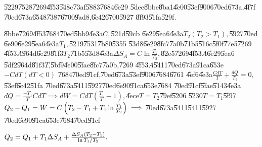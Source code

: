 \documentclass{article}
\begin{document}
\U{5229}\U{7528}\U{7269}\U{4f53}\U{548c}\U{73af}\U{5883}\U{7684}\U{6e29}%
\U{5dee}\U{8bbe}\U{8ba1}\U{4e00}\U{53ef}\U{9006}\U{70ed}\U{673a},\U{4f7f}%
\U{70ed}\U{673a}\U{6548}\U{7387}\U{6700}\U{9ad8},\U{6c42}\U{6700}\U{5927}%
\U{8f93}\U{51fa}\U{529f}.

\U{8bbe}\U{7269}\U{4f53}\U{7684}\U{70ed}\U{5bb9}\U{4e3a}$C,$\U{521d}\U{59cb}%
\U{6e29}\U{5ea6}\U{4e3a}$T_{2}\left( T_{2}>T_{1}\right) ,$\U{5927}\U{70ed}%
\U{6e90}\U{6e29}\U{5ea6}\U{4e3a}$T_{1},$\U{5219}\U{7531}\U{7b80}\U{5355}%
\U{53d8}\U{6e29}\U{8fc7}\U{7a0b}\U{71b5}\U{516c}\U{5f0f}\U{77e5}\U{7269}%
\U{4f53}$A$\U{964d}\U{6e29}\U{81f3}$T_{2}$\U{71b5}\U{53d8}\U{4e3a}$\Delta
S_{A}=C\ln \frac{T_{1}}{T_{2}},$\U{82e5}\U{7269}\U{4f53}$A$\U{6e29}\U{5ea6}%
\U{5df2}\U{964d}\U{81f3}$T$,\U{5bf9}\U{4e00}\U{5fae}\U{8fc7}\U{7a0b},\U{7269}%
\U{4f53}$A$\U{5411}\U{70ed}\U{673a}\U{91ca}\U{653e}$-CdT\left( dT<0\right) $%
\U{7684}\U{70ed}\U{91cf},\U{70ed}\U{673a}\U{53ef}\U{9006}\U{7684}\U{6761}%
\U{4ef6}\U{4e3a}$\frac{CdT}{T}+\frac{dQ}{T_{1}}=0,$\U{53ef}\U{6c42}\U{51fa}%
\U{70ed}\U{673a}\U{5411}\U{5927}\U{70ed}\U{6e90}\U{91ca}\U{653e}\U{7684}%
\U{70ed}\U{91cf}\U{5fae}\U{5143}\U{4e3a}$dQ=\frac{-T_{1}}{T}CdT\implies
dW=CdT\left( \frac{T_{1}}{T}-1\right) ,$\U{4ece}$T=T_{2}$\U{79ef}\U{5206}%
\U{5230}$T=T_{1}$\U{5f97}$Q_{2}-Q_{1}=W=C\left( T_{2}-T_{1}+T_{1}\ln \frac{%
T_{1}}{T_{2}}\right) \implies $\U{70ed}\U{673a}\U{5411}\U{5411}\U{5927}%
\U{70ed}\U{6e90}\U{91ca}\U{653e}\U{7684}\U{70ed}\U{91cf}

$Q_{2}=Q_{1}+T_{1}\Delta S_{A}+\frac{\Delta S_{A}\left( T_{2}-T_{1}\right) }{%
\ln T_{1}/T_{2}}.$
\end{document}
